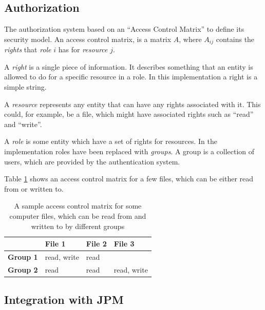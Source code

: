 \subsection{Authorization}
\label{sec:authorization}


The authorization system based on an ``Access Control
Matrix''\cite{sandhu1994access} to define its security model. An access control
matrix, is a matrix $A$, where $A_{ij}$ contains the \emph{rights} that
\emph{role} $i$ has for \emph{resource} $j$.

A \emph{right} is a single piece of information. It describes something that an
entity is allowed to do for a specific resource in a role. In this
implementation a right is a simple string.

A \emph{resource} represents any entity that can have any rights associated
with it. This could, for example, be a file, which might have associated rights
such as ``read'' and ``write''.

A \emph{role} is some entity which have a set of rights for resources. In the
implementation roles have been replaced with \emph{groups}. A group is a
collection of users, which are provided by the authentication system.

Table \ref{tab:acm_example} shows an access control matrix for a few files,
which can be either read from or written to.

\begin{table}[H]
  \begin{center}
  \begin{tabular}{ | l | l | l | l | }
    \hline
            & \textbf{File 1}        & \textbf{File 2}      & \textbf{File 3}
    \\ \hline
    \textbf{Group 1} & read, write   & read                 &
    \\ \hline
    \textbf{Group 2} & read          & read                 & read, write
    \\ \hline
  \end{tabular}
  \end{center}

  \caption{A sample access control matrix for some computer files, which can be
      read from and written to by different groups}

  \label{tab:acm_example}
\end{table}

\subsection{Integration with JPM}

